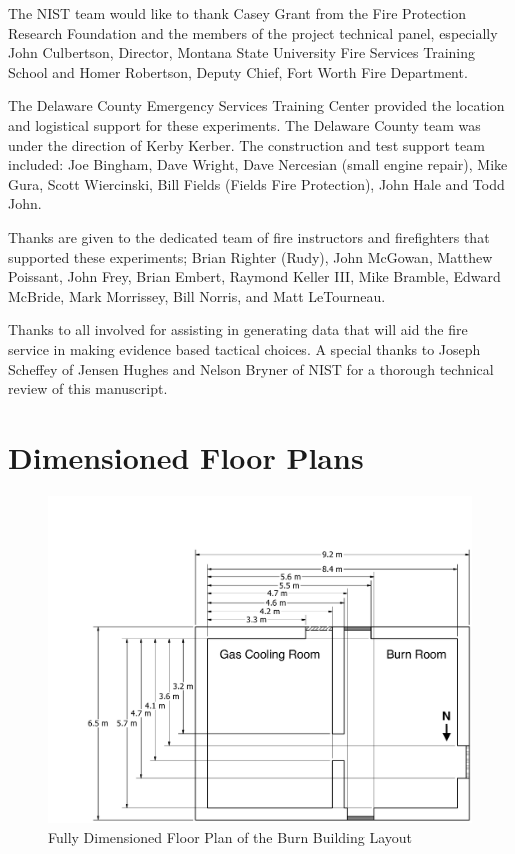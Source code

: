 \documentclass[12pt,oneside]{book}
\begin{document}
The NIST team would like to thank Casey Grant from the Fire Protection Research Foundation and the members of the project technical panel, especially John Culbertson, Director, Montana State University Fire Services Training School and Homer Robertson, Deputy Chief, Fort Worth Fire Department.  

The Delaware County Emergency Services Training Center provided the location and logistical support for these experiments. The Delaware County team was under the direction of Kerby Kerber.  The construction and test support team included: Joe Bingham, Dave Wright, Dave Nercesian (small engine repair), Mike Gura, Scott Wiercinski, Bill Fields (Fields Fire Protection), John Hale and Todd John.

Thanks are given to the dedicated team of fire instructors and firefighters that supported these experiments; Brian Righter (Rudy), John McGowan, Matthew Poissant, John Frey, Brian Embert, Raymond Keller III, Mike Bramble, Edward McBride, Mark Morrissey, Bill Norris, and Matt LeTourneau.

Thanks to all involved for assisting in generating data that will aid the fire service in making evidence based tactical choices. A special thanks to Joseph Scheffey of Jensen Hughes and Nelson Bryner of NIST for a thorough technical review of this manuscript.



\appendix

\chapter{Dimensioned Floor Plans}
\label{app:floor_plans}

\begin{figure}[!ht]
	\includegraphics[width=\columnwidth]{../Figures/Floor_Plans/PDFs/West_Structure/DelCo_2012_West_Structure_Detailed}
	\caption{Fully Dimensioned Floor Plan of the Burn Building Layout}
	\label{fig:Delaware_County,_PA_Burn_Building_Layout_Detailed}
\end{figure}
\end{document}
